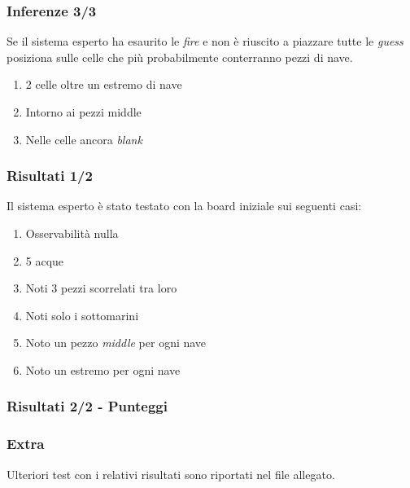 \documentclass[11pt]{beamer}
\begin{document}
\begin{frame}
    \frametitle{Inferenze 3/3}
    Se il sistema esperto ha esaurito le \emph{fire} e non è riuscito a piazzare tutte le \emph{guess} posiziona sulle celle che più probabilmente conterranno pezzi di nave.
    \begin{enumerate}
        \item 2 celle oltre un estremo di nave 
        \item Intorno ai pezzi middle
        \item Nelle celle ancora \emph{blank}
    \end{enumerate}
\end{frame}

\begin{frame}
    \frametitle{Risultati 1/2}
    Il sistema esperto è stato testato con la board iniziale sui seguenti casi:
    \begin{enumerate}
        \item Osservabilità nulla
        \item 5 acque 
        \item Noti 3 pezzi scorrelati tra loro
        \item Noti solo i sottomarini
        \item Noto un pezzo \emph{middle} per ogni nave
        \item Noto un estremo per ogni nave
    \end{enumerate}
\end{frame}

\begin{frame}
    \frametitle{Risultati 2/2 - Punteggi}
\end{frame}

\begin{frame}[noframenumbering]
    \frametitle{Extra}

    Ulteriori test con i relativi risultati sono riportati nel file allegato.
\end{frame}
\end{document}

